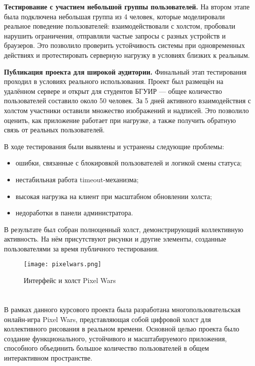 \textbf{Тестирование с участием небольшой группы пользователей.} На втором этапе была подключена небольшая группа из 4 человек, которые моделировали реальное поведение пользователей: взаимодействовали с холстом, пробовали нарушить ограничения, отправляли частые запросы с разных устройств и браузеров. Это позволило проверить устойчивость системы при одновременных действиях и протестировать серверную нагрузку в условиях близких к реальным.

\textbf{Публикация проекта для широкой аудитории.} Финальный этап тестирования проходил в условиях реального использования. Проект был размещён на удалённом сервере и открыт для студентов БГУИР — общее количество пользователей составило около 50 человек. За 5 дней активного взаимодействия с холстом участники оставили множество изображений и надписей. Это позволило оценить, как приложение работает при нагрузке, а также получить обратную связь от реальных пользователей.

В ходе тестирования были выявлены и устранены следующие проблемы:
\begin{itemize}
    \item ошибки, связанные с блокировкой пользователей и логикой смены статуса;
    \item нестабильная работа timeout-механизма;
    \item высокая нагрузка на клиент при масштабном обновлении холста;
    \item недоработки в панели администратора.
\end{itemize}

В результате был собран полноценный холст, демонстрирующий коллективную активность. На нём присутствуют рисунки и другие элементы, созданные пользователями за время публичного тестирования.

\newpage
\clearpage

\begin{figure}[!ht]
    \texttt{[image: pixelwars.png]}
    \caption{Интерфейс и холст Pixel Wars}
\end{figure}

\newpage

\section*{}

В рамках данного курсового проекта была разработана многопользовательская онлайн-игра Pixel Wars, представляющая собой цифровой холст для коллективного рисования в реальном времени. Основной целью проекта было создание функционального, устойчивого и масштабируемого приложения, способного объединить большое количество пользователей в общем интерактивном пространстве.

